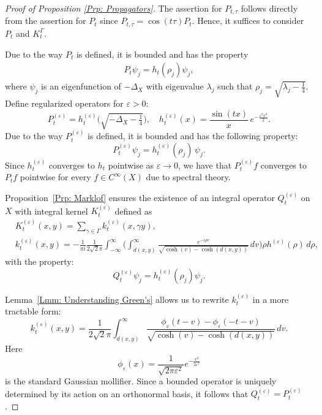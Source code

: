 \documentclass[11pt,twoside,reqno]{amsart} \usepackage{a4wide} \usepackage[T1]{fontenc} \usepackage[utf8]{inputenc} \usepackage{soul}  \usepackage{amsmath} \usepackage{amsfonts} \usepackage{amssymb} \usepackage{mathtools} \usepackage{amsthm} \usepackage{xcolor} \usepackage{graphicx} \usepackage{hyperref} \usepackage{standalone} \usepackage{esint} \usepackage{comment} \usepackage[left=2.3cm,top=3cm,right=2.3cm]{geometry} \usepackage{bm} \usepackage{svg} \usepackage{float} \numberwithin{equation}{section} \theoremstyle{plain} \newtheorem{thm}{Theorem}[section] \newtheorem{theorem}[thm]{Theorem} \newtheorem*{theorem*}{Theorem}\newtheorem{conj}[thm]{Conjecture} \newtheorem{lemma}[thm]{Lemma} \newtheorem{prop}[thm]{Proposition} \newtheorem{proposition}[thm]{Proposition} \newtheorem{cor}[thm]{Corollary} \newtheorem{question}[thm]{Question} \newtheorem{corollary}[thm]{Corollary} \newtheorem{assumption}[thm]{Assumption} \theoremstyle{definition} \newtheorem{defn}[thm]{Definition} \newtheorem{choice}[thm]{Choice} \newtheorem{definition}[thm]{Definition} \newtheorem{ex}[thm]{Example} \newtheorem{notation}[thm]{Notation} \newtheorem*{ack}{Acknowledgements} \theoremstyle{remark} \newtheorem{remark}[thm]{Remark} \newtheorem{bigremark}[thm]{Remark} \usepackage{xcolor} \newcommand{\red}[1]{ {\color{Red}#1} } \newcommand{\blue}[1]{ {\color{Blue}#1} } \author{Kai Hippi} \address{Aalto University, Espoo, Finland} \email{kai.hippi@aalto.fi}
\begin{document}
\begin{proof}[Proof of Proposition \ref{Prp: Propagators}]

The assertion for $P_{t, \tau}$ follows directly from the assertion for $P_t$ since $P_{t,\tau} = \cos(t \tau) P_{t}$. Hence, it suffices to consider $P_t$ and $K_{t}^{\Gamma}$.

Due to the way $P_{t}$ is defined, it is bounded and has the property
\begin{align*}
	P_{t} \psi_{j} = h_{t}(\rho_{j}) \psi_{j},
\end{align*}
where $\psi_{j}$ is an eigenfunction of $-\Delta_{X}$ with eigenvalue $\lambda_{j}$ such that $\rho_{j} = \sqrt{\lambda_{j} - \frac{1}{4}}$. Define regularized operators for $\varepsilon > 0$:
\[
P_t^{(\varepsilon)} = h_t^{(\varepsilon)}\Big(\sqrt{-\Delta_{X} - \tfrac14}\Big), \quad
h_t^{(\varepsilon)}(x) = \frac{\sin(tx)}{x} \, e^{- \frac{\varepsilon^2 x^2}{2}}.
\]
Due to the way $P_{t}^{(\varepsilon)}$ is defined, it is bounded and has the following property:
$$P_t^{(\varepsilon)} \psi_j = h_t^{(\varepsilon)}(\rho_j) \, \psi_j.$$ 
Since $h_{t}^{(\varepsilon)}$ converges to $h_{t}$ pointwise as $\varepsilon \to 0$, we have that $P_{t}^{(\varepsilon)} f$ converges to $P_{t} f$ pointwise for every $f \in C^{\infty}( X )$ due to spectral theory.

Proposition~\ref{Prp: Marklof} ensures the existence of an integral operator $Q_t^{(\varepsilon)}$ on $X$ with integral kernel $K_{t}^{(\varepsilon)}$ defined as
\begin{align*}
	&
	K_t^{(\varepsilon)}(x,y) = \sum_{\gamma \in \Gamma} k_t^{(\varepsilon)}(x, \gamma y), 
\\
	&
k_t^{(\varepsilon)}(x,y) = - \frac{1}{\pi i} \frac{1}{2\sqrt{2}\pi} \int_{-\infty}^{\infty} \Bigg( \int_{d(x,y)}^\infty \frac{e^{-i\rho v}}{\sqrt{\cosh(v) - \cosh(d(x,y))}} \, dv \Bigg) \rho h^{(\varepsilon)}(\rho) \, d\rho,
\end{align*}
with the property: 
$$Q_t^{(\varepsilon)} \psi_j = h_t^{(\varepsilon)}(\rho_j) \psi_j.$$  

Lemma~\ref{Lmm: Understanding Green's} allows us to rewrite $k_t^{(\varepsilon)}$ in a more tractable form:
\[
k_t^{(\varepsilon)}(x,y) = \frac{1}{2\sqrt{2} \pi} \int_{d(x,y)}^\infty \frac{\phi_\varepsilon(t-v) - \phi_\varepsilon(-t-v)}{\sqrt{\cosh(v) - \cosh(d(x,y))}} \, dv.
\]
Here 
$$\phi_\varepsilon(x) = \frac{1}{\sqrt{2\pi \varepsilon^{2}}} e^{- \frac{x^2}{2\varepsilon^2}}$$ 
is the standard Gaussian mollifier. Since a bounded operator is uniquely determined by its action on an orthonormal basis, it follows that $Q_t^{(\varepsilon)} = P_t^{(\varepsilon)}$.


\end{proof}
\end{document}

